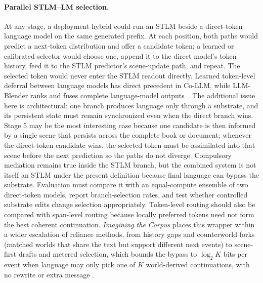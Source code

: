 \documentclass[11pt,a4paper]{article}
\begin{document}
\paragraph{Parallel STLM--LM selection.} At any stage, a deployment hybrid could run an STLM beside a direct-token language model on the same generated prefix. At each position, both paths would predict a next-token distribution and offer a candidate token; a learned or calibrated selector would choose one, append it to the direct model's token history, feed it to the STLM predictor's scene-update path, and repeat. The selected token would never enter the STLM readout directly. Learned token-level deferral between language models has direct precedent in Co-LLM, while LLM-Blender ranks and fuses complete language-model outputs~\cite{collabdecode2024,llmblender2023}. The additional issue here is architectural: one branch produces language only through a substrate, and its persistent state must remain synchronized even when the direct branch wins. Stage 5 may be the most interesting case because one candidate is then informed by a single scene that persists across the complete book or document; whenever the direct-token candidate wins, the selected token must be assimilated into that scene before the next prediction so the paths do not diverge. Compulsory mediation remains true inside the STLM branch, but the combined system is not itself an STLM under the present definition because final language can bypass the substrate. Evaluation must compare it with an equal-compute ensemble of two direct-token models, report branch-selection rates, and test whether controlled substrate edits change selection appropriately. Token-level routing should also be compared with span-level routing because locally preferred tokens need not form the best coherent continuation. \emph{Imagining the Corpus} places this wrapper within a wider escalation of reliance methods, from history gaps and counterworld forks (matched worlds that share the text but support different next events) to scene-first drafts and metered selection, which bounds the bypass to $\log_2 K$ bits per event when language may only pick one of $K$ world-derived continuations, with no rewrite or extra message \cite{documentworld2026}.
\end{document}

